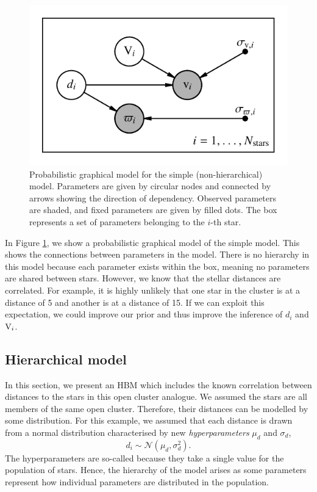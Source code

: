 \begin{figure}[tb]
    \centering
    \includegraphics{figures/simple-pgm.pdf}
    \caption{Probabilistic graphical model for the simple (non-hierarchical) model. Parameters are given by circular nodes and connected by arrows showing the direction of dependency. Observed parameters are shaded, and fixed parameters are given by filled dots. The box represents a set of parameters belonging to the \(i\)-th star.}
    \label{fig:simple-pgm}
\end{figure}

In Figure \ref{fig:simple-pgm}, we show a probabilistic graphical model of the simple model. This shows the connections between parameters in the model. There is no hierarchy in this model because each parameter exists within the box, meaning no parameters are shared between stars. However, we know that the stellar distances are correlated. For example, it is highly unlikely that one star in the cluster is at a distance of 5 and another is at a distance of 15. If we can exploit this expectation, we could improve our prior and thus improve the inference of \(d_i\) and \(\mathrm{V}_i\).

\subsection{Hierarchical model}\label{sec:hbm-model}

In this section, we present an HBM which includes the known correlation between distances to the stars in this open cluster analogue. We assumed the stars are all members of the same open cluster. Therefore, their distances can be modelled by some distribution. For this example, we assumed that each distance is drawn from a normal distribution characterised by new \emph{hyperparameters} \(\mu_d\) and \(\sigma_d\),
%
\begin{equation}
    d_i \sim \mathcal{N}(\mu_d, \sigma_d^2).
\end{equation}
%
The hyperparameters are so-called because they take a single value for the population of stars. Hence, the hierarchy of the model arises as some parameters represent how individual parameters are distributed in the population.

